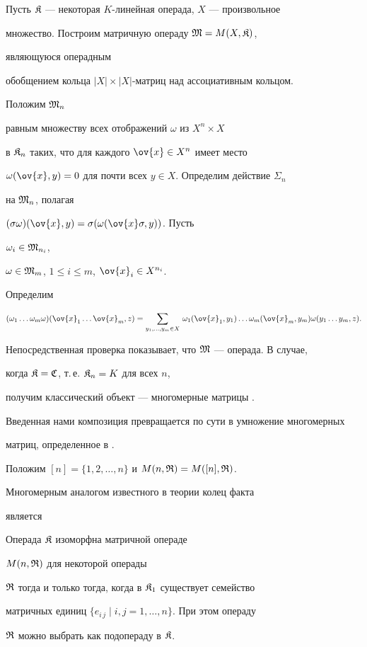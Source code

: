 Пусть $\frak K$ --- некоторая $K$-линейная операда, $X$ --- произвольное


множество. Построим матричную операду $\frak M=M(X,\frak K)$,


являющуюся операдным


обобщением кольца $|X|\times |X|$-матриц над ассоциативным кольцом.


Положим $\frak M_n$


равным множеству всех отображений $\omega$ из $X^n\times X$


в $\frak K_n$ таких, что для каждого $\ov{x}\in X^n$ имеет место


$\omega(\ov{x},y)=0$ для почти всех $y\in X$. Определим действие $\Sigma_n$


на $\frak M_n$, полагая


$(\sigma\omega)(\ov{x},y)=\sigma (\omega(\ov{x}\sigma,y))$. Пусть


$\omega_i\in \frak M_{n_i}$,


$\omega\in \frak M_m$, $1\le i \le m$, $\ov{x}_i \in X^{n_i}$.


Определим


$$


(\omega_1\dotsc\omega_m\omega)(\ov{x}_1\dotsc\ov{x}_m,z)=


\sum_{y_1,\dotsc,y_m\in X}\, \omega_1(\ov{x}_1,y_1)\dotsc


\omega_m(\ov{x}_m,y_m)\omega(y_1\dotsc y_m,z).


$$


Непосредственная проверка показывает, что $\frak M$ --- операда. В случае,


когда $\frak K=\frak C$, т.\,е. $\frak K_n=K$ для всех $n$,


получим классический объект --- многомерные матрицы \cite{Soc2}.


Введенная нами композиция превращается по сути в умножение многомерных


матриц, определенное в \cite{Gas}.





Положим $[n]=\{1,2,\dotsc, n\}$ и $M(n,\frak R)=M([n], \frak R)$.


Многомерным аналогом известного в теории колец факта


\cite{Jac} является





\begin{thm}


Операда $\frak K$ изоморфна матричной операде


$M(n,\frak R)$ для некоторой операды


$\frak R$ тогда и только тогда, когда в $\frak K_1$ существует семейство


матричных единиц $\{e_{i\,j}\mid i,j=1,\dotsc,n\}$. При этом операду


$\frak R$ можно выбрать как подопераду в $\frak K$.


\end{thm}





